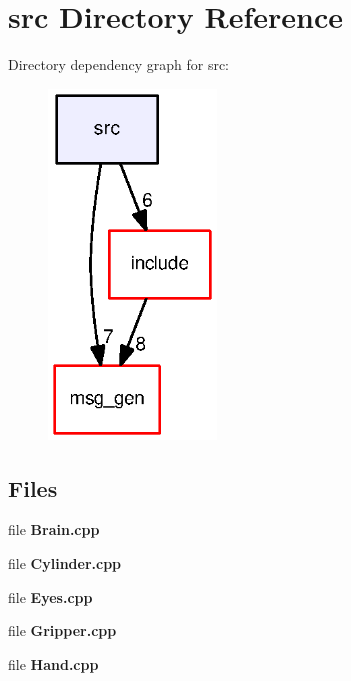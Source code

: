 \section{src Directory Reference}
\label{dir_68267d1309a1af8e8297ef4c3efbcdba}
Directory dependency graph for src\-:
\nopagebreak
\begin{figure}[H]
\begin{center}
\leavevmode
\includegraphics[width=127pt]{dir_68267d1309a1af8e8297ef4c3efbcdba_dep}
\end{center}
\end{figure}
\subsection*{Files}
\begin{DoxyCompactItemize}
\item 
file {\bf Brain.\-cpp}
\item 
file {\bf Cylinder.\-cpp}
\item 
file {\bf Eyes.\-cpp}
\item 
file {\bf Gripper.\-cpp}
\item 
file {\bf Hand.\-cpp}
\end{DoxyCompactItemize}

